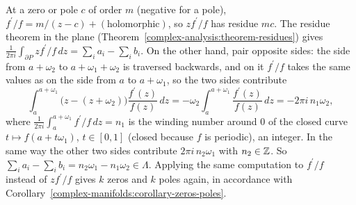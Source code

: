 \begin{solution}
At a zero or pole $c$ of order $m$ (negative for a pole), $f^{\prime}/f = m/(z - c) + (\text{holomorphic})$, so $zf^{\prime}/f$ has residue $mc$. The residue theorem in the plane
(Theorem~\ref{complex-analysis:theorem-residues}) gives $\frac{1}{2\pi i}\int_{\partial P}zf^{\prime}/f\,dz = \sum_ia_i - \sum_ib_i$. On the other hand, pair opposite sides: the side from $a + \omega_2$ to
$a + \omega_1 + \omega_2$ is traversed backwards, and on it $f^{\prime}/f$ takes the same values as on the side from $a$ to $a + \omega_1$, so the two sides contribute
\[
\int_a^{a+\omega_1}\bigl(z - (z + \omega_2)\bigr)\frac{f^{\prime}(z)}{f(z)}\,dz = -\omega_2\int_a^{a+\omega_1}\frac{f^{\prime}(z)}{f(z)}\,dz = -2\pi i\,n_1\omega_2,
\]
where $\frac{1}{2\pi i}\int_a^{a+\omega_1}f^{\prime}/f\,dz = n_1$ is the winding number around $0$ of the closed curve $t \mapsto f(a + t\omega_1)$, $t \in [0, 1]$ (closed because $f$ is periodic), an
integer. In the same way the other two sides contribute $2\pi i\,n_2\omega_1$ with $n_2 \in \mathbb{Z}$. So $\sum_ia_i - \sum_ib_i = n_2\omega_1 - n_1\omega_2 \in \Lambda$. Applying the same computation to
$f^{\prime}/f$ instead of $zf^{\prime}/f$ gives $k$ zeros and $k$ poles again, in accordance with Corollary~\ref{complex-manifolds:corollary-zeros-poles}.
\end{solution}
